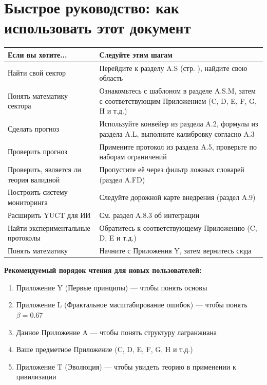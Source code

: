 \documentclass[11pt,a4paper]{article}
\begin{document}
	\section*{Быстрое руководство: как использовать этот документ}
	
	\begin{tabularx}{\textwidth}{|p{3.5cm}|X|}
		\hline
		\textbf{Если вы хотите...} & \textbf{Следуйте этим шагам} \\
		\hline
		Найти свой сектор & Перейдите к разделу A.S (стр. \pageref{sec:sector-catalog}), найдите свою область \\
		\hline
		Понять математику сектора & Ознакомьтесь с шаблоном в разделе A.S.M, затем с соответствующим Приложением (C, D, E, F, G, H и т.д.) \\
		\hline
		Сделать прогноз & Используйте конвейер из раздела A.2, формулы из раздела A.L, выполните калибровку согласно A.3 \\
		\hline
		Проверить прогноз & Примените протокол из раздела A.5, проверьте по наборам ограничений \\
		\hline
		Проверить, является ли теория валидной & Пропустите её через фильтр ложных словарей (раздел A.FD) \\
		\hline
		Построить систему мониторинга & Следуйте дорожной карте внедрения (раздел A.9) \\
		\hline
		Расширить YUCT для ИИ & См. раздел A.8.3 об интеграции \\
		\hline
		Найти экспериментальные протоколы & Обратитесь к соответствующему Приложению (C, D, E и т.д.) \\
		\hline
		Понять математику & Начните с Приложения Y, затем вернитесь сюда \\
		\hline
	\end{tabularx}
	
	\vspace{0.5cm}
	\noindent\textbf{Рекомендуемый порядок чтения для новых пользователей:}
	\begin{enumerate}
		\item Приложение Y (Первые принципы) — чтобы понять основы
		\item Приложение L (Фрактальное масштабирование ошибок) — чтобы понять \(\beta = 0.67\)
		\item Данное Приложение A — чтобы понять структуру лагранжиана
		\item Ваше предметное Приложение (C, D, E, F, G, H и т.д.)
		\item Приложение T (Эволюция) — чтобы увидеть теорию в применении к цивилизации
	\end{enumerate}
	
\end{document}
